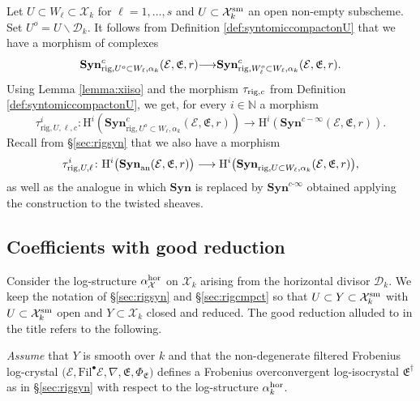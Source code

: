 \documentclass[asterisque,english]{smfart}
\begin{document}
Let  $U\subset W_\ell \subset \mathcal{X}_k$ for $\ell=1,\ldots,s$ and $U\subset \mathcal{X}_k^{\rm sm}$ an open non-empty subscheme. Set $U^o=U\backslash \mathcal{D}_k$. It follows from Definition \ref{def:syntomiccompactonU} that we have a morphism of complexes $$\mathbf{Syn}_{{\rm rig},U^o\subset W_\ell, \alpha_k}^c(\mathcal{E},\mathfrak{E},r) {\longrightarrow} \mathbf{Syn}_{{\rm rig},W_\ell^o\subset W_\ell, \alpha_k}^c(\mathcal{E},\mathfrak{E},r).$$ Using Lemma \ref{lemma:xiiso} and the morphism $\tau_{{\rm rig},c}$ from Definition \ref{def:syntomiccompactonU}, we get, for every $i\in \mathbb{N}$  a morphism
\begin{equation}\label{eq:tauRigc}
\tau_{\mathrm{rig},U,\ell,c}^i\colon\mathrm{H}^{i}\left( \mathbf{Syn}_{\mathrm{rig}
,U^{o}\subset W_\ell, \alpha_k}^{c}\left( \mathcal{E},\mathfrak{E},r\right)
\right) \longrightarrow \mathrm{H}^{i}\left( \mathbf{Syn}^{c-\infty}\left( \mathcal{
E},\mathfrak{E},r\right) \right) .  
\end{equation}
Recall from \S \ref{sec:rigsyn} that we also have a morphism 
\begin{equation} \label{eq:tauRig}
\tau_{{\rm rig},U,\ell}^i\colon \mathrm{H}^i\bigl(\mathbf{Syn}_{\rm an}(\mathcal{E},\mathfrak{E},r)\bigr) \longrightarrow \mathrm{H}^i\bigl(\mathbf{Syn}_{{\rm rig},U\subset W_\ell, \alpha_k}(\mathcal{E},\mathfrak{E},r)\bigr),
\end{equation}
as well as the analogue in which $\mathbf{Syn}$ is replaced by $\mathbf{Syn}%
^{c\text{-}\infty }$ obtained applying the construction to the twisted
sheaves.


\subsection{Coefficients with good reduction}\label{sec:Egoodred}




Consider the log-structure  $\alpha _{\mathcal{X}}^{\rm hor}$ on $\mathcal{X}_k$ arising from the horizontal divisor $\mathcal{D}_k$. We keep the notation of \S \ref{sec:rigsyn} and \S \ref{sec:rigcmpct} so that $U\subset Y\subset \mathcal{X}_k^{\rm sm}$ with $U \subset \mathcal{X}_k^{\rm sm}$ open  and $Y \subset \mathcal{X}_k$ closed and reduced. The good reduction alluded to in the title refers to the following.\smallskip

{\em Assume}  that $Y$ is smooth over $k$ and that the non-degenerate filtered Frobenius log-crystal  $ \bigl(\mathcal{E},\mathrm{Fil}^\bullet \mathcal{E}, \nabla,\mathfrak{E},\Phi_{\mathfrak{E}}\bigr)$ defines a Frobenius overconvergent log-isocrystal $\mathfrak{E}^\dagger$ as in \S \ref{sec:rigsyn} with respect to the log-structure $\alpha^{\rm hor}_k$.\smallskip
\end{document}
